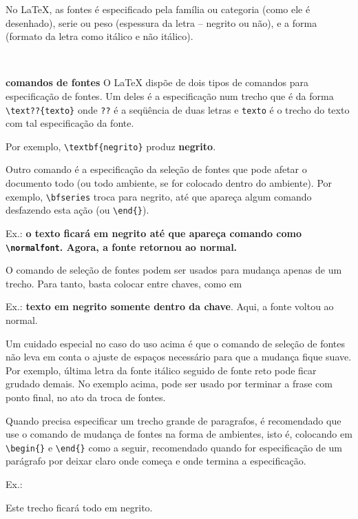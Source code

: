 \documentclass[12pt,a4paper]{article}
\begin{document}

No \LaTeX, as fontes é especificado pela família ou categoria (como ele é desenhado), serie ou peso (espessura da letra -- negrito ou não), 
e a forma (formato da letra como itálico e não itálico).

\

{\bfseries comandos de fontes}
O \LaTeX{} dispõe de dois tipos de comandos para especificação de fontes.
Um deles é a especificação num trecho que é da forma
\verb+\text??{texto}+ onde \verb+??+ é a seqüência de duas letras
e \verb+texto+ é o trecho do texto com tal especificação da fonte.

Por exemplo, \verb+\textbf{negrito}+ produz \textbf{negrito}.

Outro comando é a especificação da seleção de fontes que pode afetar 
o documento todo (ou todo ambiente, se for colocado dentro do ambiente).
Por exemplo, \verb+\bfseries+ troca para negrito, 
até que apareça algum comando desfazendo esta ação
(ou \verb+\end{}+).

Ex.: \bfseries o texto ficará em negrito até que apareça comando como
\verb+\normalfont+. 
\normalfont Agora, a fonte retornou ao normal.

O comando de seleção de fontes podem ser usados para mudança apenas de 
um trecho. Para tanto, basta colocar entre chaves, como em

Ex.: {\bfseries texto em negrito somente dentro da chave}. 
Aqui, a fonte voltou ao normal.

Um cuidado especial no caso do uso acima é que o comando de seleção 
de fontes não leva em conta o ajuste de espaços necessário para que 
a mudança fique suave. Por exemplo, última letra da fonte itálico 
seguido de fonte reto pode ficar grudado demais. No exemplo acima, 
pode ser usado por terminar a frase com ponto final, 
no ato da troca de fontes.

Quando precisa especificar um trecho grande de paragrafos, 
é recomendado que use o comando de mudança de fontes 
na forma de ambientes, isto é, colocando em
\verb+\begin{}+ e \verb+\end{}+ como a seguir, 
recomendado quando for especificação de um parágrafo por deixar 
claro onde começa e onde termina a especificação.

Ex.:
\begin{bfseries}
    Este trecho ficará todo em negrito.
\end{bfseries}
\end{document}
